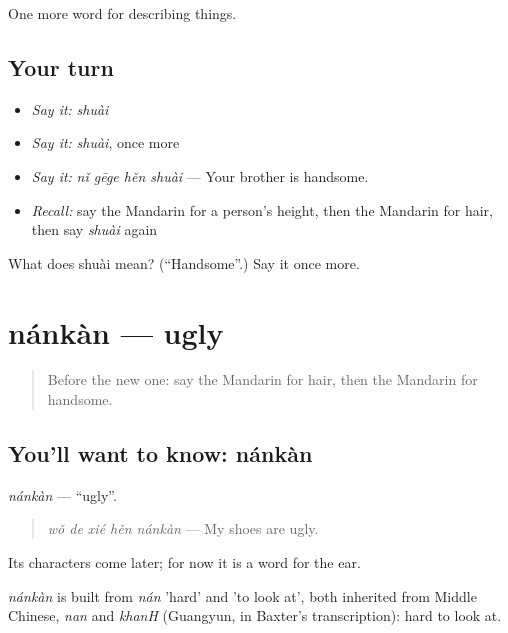 \begin{grammarlens}[title={What you've built}]
One more word for describing things.
\end{grammarlens}

\subsection*{Your turn}
\begin{itemize}
\raggedright
  \item \emph{Say it:} \emph{shuài}
  \item \emph{Say it:} \emph{shuài}, once more
  \item \emph{Say it:} \emph{nǐ gēge hěn shuài} — Your brother is handsome.
  \item \emph{Recall:} say the Mandarin for a person's height, then the Mandarin for hair, then say \emph{shuài} again
\end{itemize}

\begin{tcolorbox}[breakable,colback=teal!4,colframe=teal!35!black,title={Before you move on}]
What does shuài mean? (\textquotedblleft{}Handsome\textquotedblright{}.) Say it once more.
\end{tcolorbox}
\section[nánkàn]{nánkàn — ugly}

\label{lesson:ZH-C124-nankan}



\begin{quote}
Before the new one: say the Mandarin for hair, then the Mandarin for handsome.
\end{quote}

\subsection*{You'll want to know: nánkàn}
\emph{nánkàn} — \textquotedblleft{}ugly\textquotedblright{}.

\begin{quote}
\emph{wǒ de xié hěn nánkàn} — My shoes are ugly.
\end{quote}

Its characters come later; for now it is a word for the ear.

\begin{cousinweb}
\emph{nánkàn} is built from \emph{nán} 'hard' and  'to look at', both inherited from Middle Chinese, \emph{nan} and \emph{khanH} (Guangyun, in Baxter's transcription): hard to look at.
\end{cousinweb}

